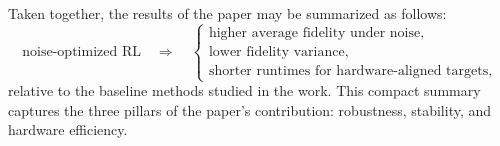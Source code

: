 Taken together, the results of the paper may be summarized as follows:
\begin{equation}
\text{noise-optimized RL}
\quad\Longrightarrow\quad
\begin{cases}
\text{higher average fidelity under noise},\\
\text{lower fidelity variance},\\
\text{shorter runtimes for hardware-aligned targets},
\end{cases}
\label{eq:summary_main_findings}
\end{equation}
relative to the baseline methods studied in the work. This compact summary captures the three pillars of the paper's contribution: robustness, stability, and hardware efficiency.

